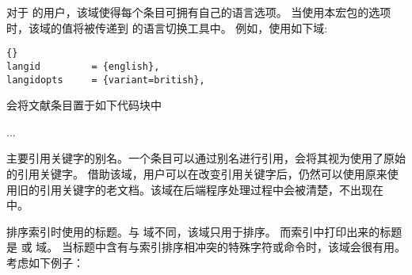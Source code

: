 \begin{fieldlist}



对于  的用户，该域使得每个条目可拥有自己的语言选项。
当使用本宏包的选项  时，该域的值将被传递到  的语言切换工具中。
例如，使用如下域:

\begin{lstlisting}[style=bibtex]{}
langid         = {english},
langidopts     = {variant=british},
\end{lstlisting}

会将文献条目置于如下代码块中

\begin{ltxexample}
\english[variant=british]
...
\endenglish
\end{ltxexample}
%



主要引用关键字的别名。一个条目可以通过别名进行引用，\biblatex 会将其视为使用了原始的引用关键字。
借助该域，用户可以在改变引用关键字后，仍然可以使用原来使用旧的引用关键字的老文档。该域在后端程序处理过程中会被清楚，不出现在  中。



排序索引时使用的标题。与  域不同，该域只用于排序。
而索引中打印出来的标题是  或 域。
当标题中含有与索引排序相冲突的特殊字符或命令时，该域会很有用。考虑如下例子：


\end{fieldlist}
